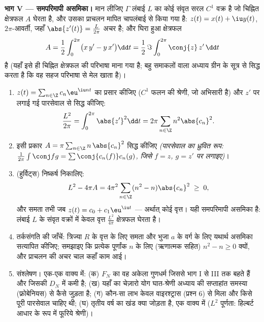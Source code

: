 \begin{problem}
\medskip
\noindent\textbf{भाग V --- समपरिमापी असमिका।} मान लीजिए $\Gamma$ लंबाई $L$ का
कोई संवृत सरल $C^1$ वक्र है जो चिह्नित क्षेत्रफल $A$ घेरता है, और उसका
प्राचलन मापित चापलंबाई से किया गया है: $z(t) =
x(t) + \iu y(t)$, $2\pi$-आवर्ती, जहाँ $\abs{z'(t)} =
\frac{L}{2\pi}$ अचर है;
और घिरा हुआ क्षेत्रफल
\[
A = \frac12\int_0^{2\pi}\bigl(x\,y' - y\,x'\bigr)\dd t
= \frac{1}{2}\,\Im\int_0^{2\pi}\conj{z}\,z'\,\dd t
\]
है (यहाँ इसे ही चिह्नित क्षेत्रफल की परिभाषा माना गया है; बहु समाकलों वाला
अध्याय ग्रीन के सूत्र से सिद्ध करता है कि वह सहज परिभाषा से मेल खाता है)।
\begin{enumerate}[resume]
  \item $z(t) = \sum_{n\in\Z}c_n\eu^{\iu nt}$ का प्रसार कीजिए ($C^1$ फलन की श्रेणी, जो 
        अभिसारी है) और $z'$ पर लगाई गई पारसेवाल से सिद्ध कीजिए:
        \[
        \frac{L^2}{2\pi} = \int_0^{2\pi}\abs{z'}^2\dd t
        = 2\pi\sum_{n\in\Z}n^2\abs{c_n}^2 .
        \]
  \item इसी प्रकार $A = \pi\sum_{n\in\Z}
        n\,\abs{c_n}^2$ सिद्ध कीजिए \emph{(पारसेवाल का ध्रुवित रूप: $\frac{1}{2\pi}\int\conj f g = \sum
        \conj{c_n(f)}c_n(g)$,
        जिसे $f = z$, $g = z'$ पर लगाइए)}।
  \item (हुर्विट्स) निष्कर्ष निकालिए:
        \[
        L^2 - 4\pi A = 4\pi^2\sum_{n\in\Z}
        (n^2 - n)\abs{c_n}^2 \;\geq\; 0 ,
        \]
        और समता तभी जब $z(t) = c_0 +
        c_1\eu^{\iu t}$ --- अर्थात् कोई वृत्त। यही समपरिमापी असमिका
        है: लंबाई $L$ के संवृत वक्रों में केवल वृत्त $\frac{L^2}{4\pi}$ क्षेत्रफल
        घेरता है।
  \item तर्कसंगति की जाँचें: त्रिज्या $R$ के वृत्त के लिए समता और भुजा
        $a$ के वर्ग के लिए यथार्थ असमिका सत्यापित कीजिए; समझाइए कि
        प्रत्येक पूर्णांक $n$ के लिए (ऋणात्मक सहित) $n^2 - n \geq 0$ क्यों, और
        प्राचलन की अचर चाल कहाँ काम आई।
  \item संश्लेषण। एक-एक वाक्य में: (क) $F_N$ का वह अकेला गुणधर्म जिससे
        भाग I से III तक बहते हैं और जिसकी $D_N$ में कमी है; (ख) यहाँ का
        चेज़ारो योग घात-श्रेणी अध्याय की सप्ताहांत समस्या (फ्रोबेनियस) से
        कैसे जुड़ता है; (ग) कौन-सा लाभ केवल वाइरश्ट्रास (प्रश्न 6) से
        मिला और किसे पूरी पारसेवाल चाहिए थी; (घ) तृतीय वर्ष का खंड क्या
        जोड़ता है, एक वाक्य में ($L^2$ पूर्णता: हिल्बर्ट आधार के रूप में
        फूरिये श्रेणी)।
\end{enumerate}
\end{problem}

